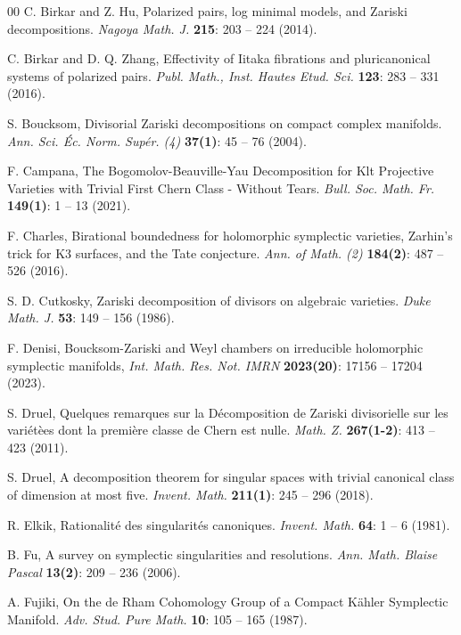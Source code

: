 \documentclass[12pt,reqno]{amsart}
\theoremstyle{plain}
\theoremstyle{definition}
\begin{document}
\begin{thebibliography}{00}
C. Birkar and Z. Hu, Polarized pairs, log minimal models, and Zariski decompositions. \textit{Nagoya Math. J.} \textbf{215}:  203 -- 224 (2014). 

C. Birkar and D. Q. Zhang,  Effectivity of Iitaka fibrations and pluricanonical systems of polarized pairs. \textit{Publ. Math., Inst. Hautes Etud. Sci.} \textbf{123}: 283 -- 331 (2016).


S. Boucksom, Divisorial Zariski decompositions on compact complex manifolds. \textit{Ann. Sci. \'Ec. Norm. Sup\'er. (4)} \textbf{37(1)}: 45 -- 76 (2004).

F. Campana, The Bogomolov-Beauville-Yau Decomposition for Klt Projective Varieties with Trivial First Chern Class - Without Tears. \textit{Bull. Soc. Math. Fr.} \textbf{149(1)}: 1 -- 13 (2021).


F. Charles, Birational boundedness for holomorphic symplectic varieties, Zarhin's trick for K3 surfaces, and the Tate conjecture. \textit{Ann. of Math. (2)} \textbf{184(2)}: 487 -- 526 (2016).

S. D. Cutkosky, Zariski decomposition of divisors on algebraic varieties. \textit{Duke Math. J.} \textbf{53}: 149 -- 156 (1986).

F. Denisi, Boucksom-Zariski and Weyl chambers on irreducible holomorphic symplectic manifolds, \textit {Int. Math. Res. Not. IMRN} \textbf{2023(20)}: 17156 -- 17204 (2023).

S. Druel, Quelques remarques sur la D\'ecomposition de Zariski divisorielle sur les vari\'et\`ees dont la premi\`ere classe de Chern est nulle. \textit{Math. Z.} \textbf{267(1-2)}: 413 -- 423 (2011).

S. Druel, A decomposition theorem for singular spaces with trivial canonical class of dimension at most five. \textit{Invent. Math.} \textbf{211(1)}: 245 -- 296 (2018).

R. Elkik, Rationalit\'e des singularit\'es canoniques. \textit{Invent. Math.} \textbf{64}: 1 -- 6 (1981).

B. Fu, A survey on symplectic singularities and resolutions. \textit{Ann. Math. Blaise Pascal} \textbf{13(2)}: 209 -- 236 (2006).

A. Fujiki, On the de Rham Cohomology Group of a Compact K\"ahler Symplectic Manifold. \textit{Adv. Stud. Pure Math.} \textbf{10}: 105 -- 165 (1987).


\end{thebibliography}
\end{document}
